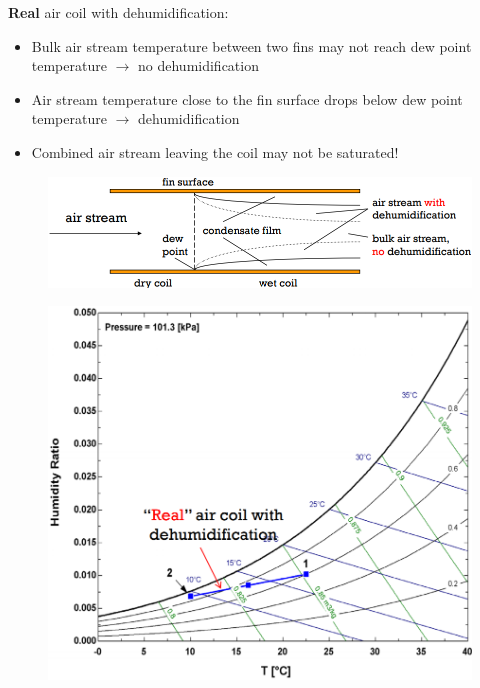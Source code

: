 \documentclass[class=report, crop=false, 12pt,a4paper]{standalone}
\numberwithin{equation}{section}
\begin{document}
\textbf{Real} air coil with dehumidification:
\begin{itemize}[noitemsep]
  \item Bulk air stream temperature between two fins may not reach dew point temperature $\longrightarrow$ no dehumidification
  \item Air stream temperature close to the fin surface drops below dew point temperature $\longrightarrow$ dehumidification
  \item Combined air stream leaving the coil may not be saturated!
\end{itemize}
\begin{figure}[H]
  \centering
  \includegraphics[width = 0.7 \textwidth]{../img/diagram115.png}
  \caption{}
\end{figure}
\begin{figure}[H]
  \centering
  \includegraphics[width = 0.7 \textwidth]{../img/diagram116.png}
  \caption{}
\end{figure}
\end{document}
